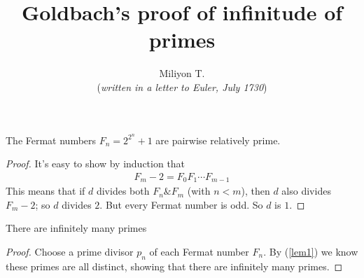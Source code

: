 \documentclass[12pt]{article}
\newenvironment{theorem}[2][Theorem]{\begin{trivlist}
\item[\hskip \labelsep {\bfseries #1}\hskip \labelsep {\bfseries #2.}]}{\end{trivlist}}
\newenvironment{lemma}[2][Lemma]{\begin{trivlist}
\item[\hskip \labelsep {\bfseries #1}\hskip \labelsep {\bfseries #2.}]}{\end{trivlist}}
\begin{document}

\title{Goldbach's proof of infinitude of primes}%

\author{Miliyon T.\\ %
(\textit{written in a letter to Euler, July 1730})} %

\maketitle
\begin{lemma}{1}\label{lem1}
The Fermat numbers $F_n=2^{2^n}+1$ are pairwise relatively prime.
\end{lemma}

\begin{proof}
It's easy to show by induction that
\begin{align*}
F_{m}-2=F_0 F_1 \cdots F_{m-1}
\end{align*}
This means that if $d$ divides both $F_n \& F_m$ (with $n<m$), then $d$ also divides $F_{m}-2$; so $d$ divides $2$. But every Fermat number is odd. So $d$ is $1$.
\end{proof}
\begin{theorem}{1}
There are infinitely many primes
\end{theorem}

\begin{proof}
Choose a prime divisor $p_n$ of each Fermat number $F_n$.
By (\ref{lem1}) we know these primes are all distinct, showing that there are  infinitely many primes.

\end{proof}

\end{document}
